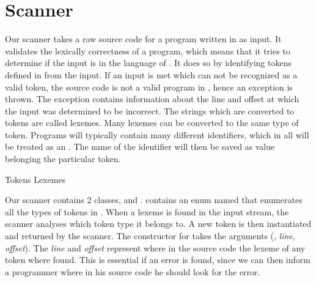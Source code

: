 \section{Scanner}
Our scanner takes a raw source code for a program written in \productname{} as input. It validates the lexically correctness of a \productname{} program, which means that it tries to determine if the input is in the language of \productname{}. It does so by identifying tokens defined in \productname{} from the input. If an input is met which can not be recognized as a valid token, the source code is not a valid program in \productname{}, hence an exception is thrown. The exception contains information about the line and offset at which the input was determined to be incorrect.
 The strings which are converted to tokens are called lexemes. Many lexemes can be converted to the same type of token. Programs will typically contain many different identifiers, which in \productname{} all will be treated as an . The name of the identifier will then be saved as value belonging the particular token.

                 {Tokens}
       {Lexemes	}{						}{
\tabrow{$[$    	}{ LBRACKET				}
\tabrow{$]$		}{ RBRACKET 			}
}

Our scanner contains 2 classes,  and .  contains an enum named  that enumerates all the types of tokens in \productname{}. When a lexeme is found in the input stream, the scanner analyses which token type it belongs to. A new token is then instantiated and returned by the scanner. The constructor for  takes the arguments (, \textit{line}, \textit{offset}). The \textit{line} and \textit{offset} represent where in the source code the lexeme of any token where found. This is essential if an error is found, since we can then inform a programmer where in his source code he should look for the error.
 
